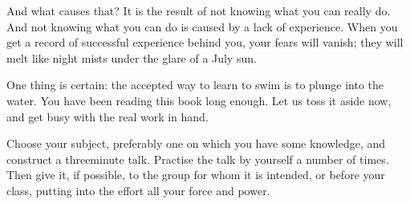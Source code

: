 \documentclass[10pt]{article}
\begin{document}
And what causes that? It is the result of not knowing what you can really do. And not knowing what you can do is caused by a lack of experience. When you get a record of successful experience behind you, your fears will vanish; they will melt like night mists under the glare of a July sun.

One thing is certain: the accepted way to learn to swim is to plunge into the water. You have been reading this book long enough. Let us toss it aside now, and get busy with the real work in hand.

Choose your subject, preferably one on which you have some knowledge, and construct a threeminute talk. Practise the talk by yourself a number of times. Then give it, if possible, to the group for whom it is intended, or before your class, putting into the effort all your force and power.
\end{document}
